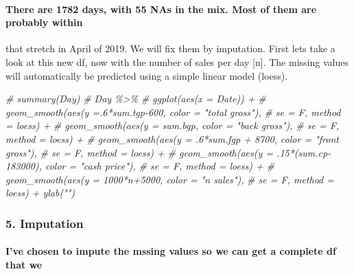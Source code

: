 \documentclass[
]{article}
\newenvironment{Shaded}{\begin{snugshade}}{\end{snugshade}}
\newcommand{\CommentTok}[1]{\textcolor[rgb]{0.56,0.35,0.01}{\textit{#1}}}
\begin{document}
\hypertarget{there-are-1782-days-with-55-nas-in-the-mix.-most-of-them-are-probably-within}{%
\paragraph{There are 1782 days, with 55 NAs in the mix. Most of them are
probably
within}\label{there-are-1782-days-with-55-nas-in-the-mix.-most-of-them-are-probably-within}}

that stretch in April of 2019. We will fix them by imputation. First
lets take a look at this new df, now with the number of sales per day
{[}n{]}. The missing values will automatically be predicted using a
simple linear model (loess).

\begin{Shaded}
\begin{Highlighting}[]
\CommentTok{\# summary(Day)}
\CommentTok{\# Day \%\textgreater{}\%}
\CommentTok{\# ggplot(aes(x = Date)) + }
\CommentTok{\#   geom\_smooth(aes(y =.6*sum.tgp{-}600, color = "total gross"), }
\CommentTok{\#               se = F, method = \textquotesingle{}loess\textquotesingle{}) +}
\CommentTok{\#   geom\_smooth(aes(y = sum.bgp, color = "back gross"), }
\CommentTok{\#               se = F, method = \textquotesingle{}loess\textquotesingle{}) + }
\CommentTok{\#   geom\_smooth(aes(y = .6*sum.fgp + 8700, color = "front gross"), }
\CommentTok{\#               se = F, method = \textquotesingle{}loess\textquotesingle{}) +}
\CommentTok{\#   geom\_smooth(aes(y = .15*(sum.cp{-}183000), color = "cash price"), }
\CommentTok{\#               se = F, method = \textquotesingle{}loess\textquotesingle{}) +}
\CommentTok{\#   geom\_smooth(aes(y = 1000*n+5000, color = "n sales"), }
\CommentTok{\#               se = F, method = \textquotesingle{}loess\textquotesingle{}) + ylab("")}
\end{Highlighting}
\end{Shaded}

\hypertarget{imputation}{%
\subsubsection{5. Imputation}\label{imputation}}

\hypertarget{ive-chosen-to-impute-the-mssing-values-so-we-can-get-a-complete-df-that-we}{%
\paragraph{I've chosen to impute the mssing values so we can get a
complete df that
we}\label{ive-chosen-to-impute-the-mssing-values-so-we-can-get-a-complete-df-that-we}}
\end{document}
